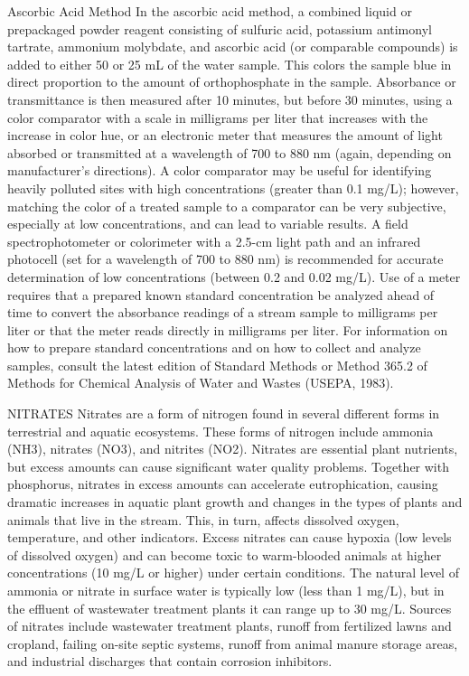 \documentclass{article}
\begin{document}
Ascorbic Acid Method In the ascorbic acid method, a combined liquid or
prepackaged powder reagent consisting of sulfuric acid, potassium
antimonyl tartrate, ammonium molybdate, and ascorbic acid (or comparable
compounds) is added to either 50 or 25 mL of the water sample. This
colors the sample blue in direct proportion to the amount of
orthophosphate in the sample. Absorbance or transmittance is then
measured after 10 minutes, but before 30 minutes, using a color
comparator with a scale in milligrams per liter that increases with the
increase in color hue, or an electronic meter that measures the amount
of light absorbed or transmitted at a wavelength of 700 to 880 nm
(again, depending on manufacturer's directions). A color comparator may
be useful for identifying heavily polluted sites with high
concentrations (greater than 0.1 mg/L); however, matching the color of a
treated sample to a comparator can be very subjective, especially at low
concentrations, and can lead to variable results. A field
spectrophotometer or colorimeter with a 2.5-cm light path and an
infrared photocell (set for a wavelength of 700 to 880 nm) is
recommended for accurate determination of low concentrations (between
0.2 and 0.02 mg/L). Use of a meter requires that a prepared known
standard concentration be analyzed ahead of time to convert the
absorbance readings of a stream sample to milligrams per liter or that
the meter reads directly in milligrams per liter. For information on how
to prepare standard concentrations and on how to collect and analyze
samples, consult the latest edition of Standard Methods or Method 365.2
of Methods for Chemical Analysis of Water and Wastes (USEPA, 1983).

NITRATES Nitrates are a form of nitrogen found in several different
forms in terrestrial and aquatic ecosystems. These forms of nitrogen
include ammonia (NH3), nitrates (NO3), and nitrites (NO2). Nitrates are
essential plant nutrients, but excess amounts can cause significant
water quality problems. Together with phosphorus, nitrates in excess
amounts can accelerate eutrophication, causing dramatic increases in
aquatic plant growth and changes in the types of plants and animals that
live in the stream. This, in turn, affects dissolved oxygen,
temperature, and other indicators. Excess nitrates can cause hypoxia
(low levels of dissolved oxygen) and can become toxic to warm-blooded
animals at higher concentrations (10 mg/L or higher) under certain
conditions. The natural level of ammonia or nitrate in surface water is
typically low (less than 1 mg/L), but in the effluent of wastewater
treatment plants it can range up to 30 mg/L. Sources of nitrates include
wastewater treatment plants, runoff from fertilized lawns and cropland,
failing on-site septic systems, runoff from animal manure storage areas,
and industrial discharges that contain corrosion inhibitors.
\end{document}
